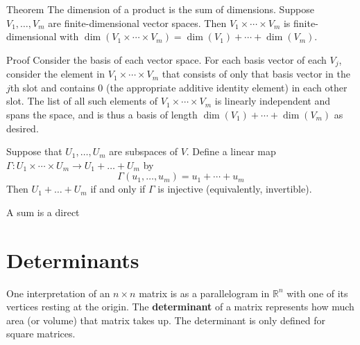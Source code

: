 \documentclass[12pt]{article}
\newcommand{\R}{\mathbb{R}}
\begin{document}
Theorem The dimension of a product is the sum of dimensions. Suppose $V_1, \ldots, V_m$ are finite-dimensional vector spaces. Then $V_1 \times \cdots \times V_m$ is finite-dimensional with $\dim\left(V_1 \times \cdots \times V_m\right) = \dim(V_1) + \cdots + \dim(V_m)$.

Proof Consider the basis of each vector space. For each basis vector of each $V_j$, consider the element in $V_1 \times \cdots \times V_m$ that consists of only that basis vector in the $j$th slot and contains 0 (the appropriate additive identity element) in each other slot. The list of all such elements of $V_1 \times \cdots \times V_m$ is linearly independent and spans the space, and is thus a basis of length $\dim(V_1) + \cdots + \dim(V_m)$ as desired.

Suppose that $U_1, \ldots, U_m$ are subspaces of $V$. Define a linear map $\Gamma : U_1 \times \cdots \times U_m \rightarrow U_1 + \ldots + U_m$ by $$\Gamma(u_1, \ldots, u_m) = u_1 + \cdots + u_m$$ Then $U_1 + \ldots + U_m$ if and only if $\Gamma$ is injective (equivalently, invertible).

A sum is a direct 

\section{Determinants}

One interpretation of an $n \times n$ matrix is as a parallelogram in $\R^n$ with one of its vertices resting at the origin. The \textbf{determinant} of a matrix represents how much area (or volume) that matrix takes up. The determinant is only defined for square matrices.
\end{document}
